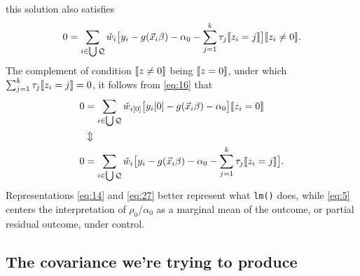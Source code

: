 \documentclass{article}
\DeclarePairedDelimiter{\indicator}{\llbracket}{\rrbracket}
\newcommand{\owt}[1][{[z_{i}]}]{\ensuremath{\check{w}_{i#1}}}
\begin{document}
this solution also satisfies
\begin{equation*}
       0 = \sum_{i \in \bigcup \mathcal{Q}}\owt[]\big[y_{i} - g(\vec{x}_{i}\beta)-
                  \alpha_{0}-\sum_{j=1}^{k}\tau_{j}\indicator{z_{i}=j}\big]\indicator{z_{i}
                  \neq 0}.
\end{equation*}
The complement of condition $\indicator{z\neq 0}$ being
$\indicator{z=0}$, under which
$\sum_{j=1}^{k}\tau_{j}\indicator{z_{i}=j}=0$, it follows from \eqref{eq:16} that
\begin{align*}
         0 &= \sum_{i \in \bigcup \mathcal{Q}}\owt[{[0]}]\big[y_{i}[0] - g(\vec{x}_{i}\beta)-
                  \alpha_{0}\big]\indicator{z_{i}
             =0}\\
           & \Updownarrow \\
         0 &= \sum_{i \in \bigcup \mathcal{Q}}\owt[]\big[y_{i} - g(\vec{x}_{i}\beta)-
                  \alpha_{0} - \sum_{j=1}^{k}\tau_{j}\indicator{z_{i}=j}\big].
\end{align*}
Representations \eqref{eq:14} and \eqref{eq:27} better represent what
\texttt{lm()} does, while \eqref{eq:5} centers the interpretation of $\rho_{0}$/$\alpha_{0}$ as a
marginal mean of the outcome, or partial residual outcome, under control.

\subsection{The covariance we're trying to
  produce}\label{sec:covar-were-trying}
\end{document}
